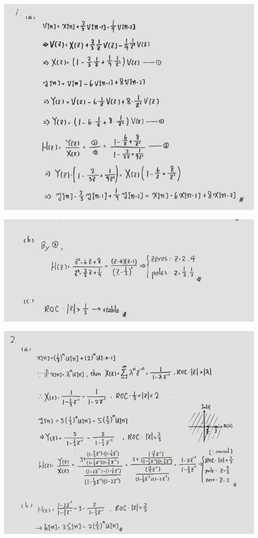 \documentclass[a4paper]{article}
\begin{document}
	
	\begin{center}
		\includegraphics[width=1\linewidth]{screenshot054}
	\end{center}
	
	
	\begin{center}
		\includegraphics[width=1\linewidth]{screenshot055}
	\end{center}
	\begin{center}
		\includegraphics[width=1\linewidth]{screenshot056}
	\end{center}
	
\end{document}
